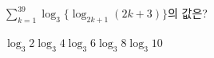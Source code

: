 \hspace*{2mm}\begin{minipage}[t]{\dimexpr\linewidth-2mm\relax}\vspace{0pt}
$\displaystyle\sum_{k=1}^{39}\log_3\{\log_{2k+1}(2k+3)\}$의 값은?
\begin{choices32}{$\log_3 2$}{$\log_3 4$}{$\log_3 6$}{$\log_3 8$}{$\log_3 10$}\end{choices32}\end{minipage}
